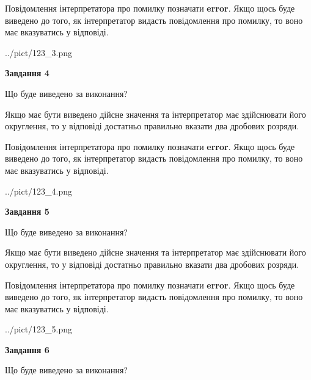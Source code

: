 \documentclass[12pt, ukrainian]{article}
\begin{document}
{\begin {Large}
Повідомлення інтерпретатора про помилку позначати \textbf{error}.
Якщо щось буде виведено до того, як інтерпретатор видасть повідомлення про помилку, 
то воно має вказуватись у відповіді. \par

\begin{center}
	{../pict/123_3.png}
\end{center}
\newpage

{\begin {center}\textbf{Завдання 4}\end {center}}\par
Що буде виведено за виконання? \par

Якщо має бути виведено дійсне значення та інтерпретатор має здійснювати його округлення, 
то у відповіді достатньо правильно вказати два дробових розряди.

Повідомлення інтерпретатора про помилку позначати \textbf{error}.
Якщо щось буде виведено до того, як інтерпретатор видасть повідомлення про помилку, 
то воно має вказуватись у відповіді. \par

\begin{center}
	{../pict/123_4.png}
\end{center}
\newpage

{\begin {center}\textbf{Завдання 5}\end {center}}\par
Що буде виведено за виконання? \par

Якщо має бути виведено дійсне значення та інтерпретатор має здійснювати його округлення, 
то у відповіді достатньо правильно вказати два дробових розряди.

Повідомлення інтерпретатора про помилку позначати \textbf{error}.
Якщо щось буде виведено до того, як інтерпретатор видасть повідомлення про помилку, 
то воно має вказуватись у відповіді. \par

\begin{center}
	{../pict/123_5.png}
\end{center}
\newpage

{\begin {center}\textbf{Завдання 6}\end {center}}\par
Що буде виведено за виконання? \par


\end{Large}}
\end{document}
